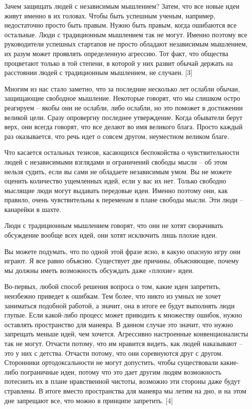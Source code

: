 \documentclass[ebook,12pt,oneside,openany]{memoir}
\begin{document}
Зачем защищать людей с независимым мышлением? Затем, что все новые
идеи живут именно в их головах. Чтобы быть успешным ученым, например,
недостаточно просто быть правым. Нужно быть правым, когда ошибаются
все остальные. Люди с традиционным мышлением так не могут. Именно
поэтому все руководители успешных стартапов не просто обладают
независимым мышлением, их разум может проявлять определенную агрессию.
Тот факт, что общества процветают только в той степени, в которой у
них развит обычай держать на расстоянии людей с традиционным
мышлением, не случаен. [3]

Многим из нас стало заметно, что за последние несколько лет ослабли
обычаи, защищающие свободное мышление. Некоторые говорят, что мы
слишком остро реагируем – якобы они не ослабли, либо ослабли, но это
поможет в достижении великой цели. Сразу опровергну последнее
утверждение. Когда обыватели берут верх, они всегда говорят, что все
делают во имя великого блага. Просто каждый раз оказывается, что речь
идет о совсем другом, неуместном великом благе.

Что касается остальных тезисов, касающихся беспокойства о
чувствительности людей с независимыми взглядами и ограничений свободы
мысли – об этом нельзя судить, если вы сами не обладаете независимым
умом. Вы не можете оценить количество ущемленных идей, если у вас их
нет. Только свободно мыслящие люди могут выдавать передовые идеи.
Именно поэтому они, как правило, очень чувствительны к переменам в
плане свободы мысли. Эти люди – канарейки в шахте.

Люди с традиционным мышлением говорят, что они не хотят сворачивать
обсуждение вообще всех идей, они хотят исключить лишь плохие идеи.

Вы можете подумать, что по одной этой фразе ясно, в какую опасную игру
они играют. Я все равно объясню. Существует две причины, объясняющие,
почему мы должны иметь возможность обсуждать даже «плохие» идеи.

Во-первых, любой способ решения вопроса о том, какие идеи запретить,
неизбежно приведет к ошибкам. Тем более, что никто из умных не хочет
заниматься подобной работой, а значит, она в итоге ее будут выполнять
люди глупые. Если какой-либо процесс может приводить к множеству
ошибок, нужно оставлять пространство для маневра. В данном случае это
значит, что нужно запрещать меньше идей, чем хочется. Агрессивно
настроенные конвенционалисты так не могут. Отчасти потому, что им
нравится видеть, как людей наказывают – это у них с детства. Отчасти
потому, что они соревнуются друг с другом. Сторонники ортодоксальности
не могут допустить, чтобы существовали какие-либо пограничные идеи,
потому что это дает другим людям возможность потеснить их в плане
нравственной чистоты, возможно эти стороны даже будут стравлены. В
итоге вместо пространства для маневра мы летим на дно, и на этом дне
запрещают все, что можно в принципе запретить. [4]
\end{document}
